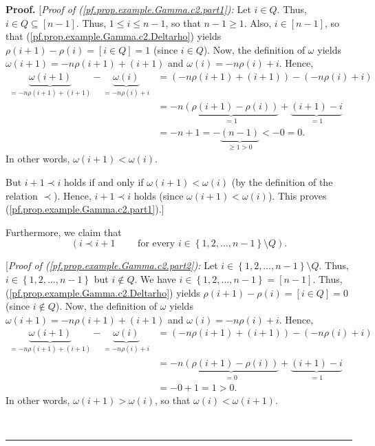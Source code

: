 \documentclass[numbers=enddot,12pt,final,onecolumn,notitlepage,abstracton]{scrartcl}
\theoremstyle{definition}
\newenvironment{proof}[1][Proof]{\noindent\textbf{#1.} }{\ \rule{0.5em}{0.5em}}
\newenvironment{verlong}{}{}
\begin{document}
\begin{verlong}
\begin{footnotesize}
\begin{proof}
[\textit{Proof of (\ref{pf.prop.example.Gamma.c2.part1}):} Let $i\in Q$. Thus,
$i\in Q\subseteq\left[  n-1\right]  $. Thus, $1\leq i\leq n-1$, so that
$n-1\geq1$. Also, $i\in\left[  n-1\right]  $, so that
(\ref{pf.prop.example.Gamma.c2.Deltarho}) yields $\rho\left(  i+1\right)
-\rho\left(  i\right)  =\left[  i\in Q\right]  =1$ (since $i\in Q$). Now, the
definition of $\omega$ yields $\omega\left(  i+1\right)  =-n\rho\left(
i+1\right)  +\left(  i+1\right)  $ and $\omega\left(  i\right)  =-n\rho\left(
i\right)  +i$. Hence,%
\begin{align*}
\underbrace{\omega\left(  i+1\right)  }_{=-n\rho\left(  i+1\right)  +\left(
i+1\right)  }-\underbrace{\omega\left(  i\right)  }_{=-n\rho\left(  i\right)
+i}  &  =\left(  -n\rho\left(  i+1\right)  +\left(  i+1\right)  \right)
-\left(  -n\rho\left(  i\right)  +i\right) \\
&  =-n\underbrace{\left(  \rho\left(  i+1\right)  -\rho\left(  i\right)
\right)  }_{=1}+\underbrace{\left(  i+1\right)  -i}_{=1}\\
&  =-n+1=-\underbrace{\left(  n-1\right)  }_{\geq1>0}<-0=0.
\end{align*}
In other words, $\omega\left(  i+1\right)  <\omega\left(  i\right)  $.

But $i+1\prec i$ holds if and only if $\omega\left(  i+1\right)
<\omega\left(  i\right)  $ (by the definition of the relation $\prec$). Hence,
$i+1\prec i$ holds (since $\omega\left(  i+1\right)  <\omega\left(  i\right)
$). This proves (\ref{pf.prop.example.Gamma.c2.part1}).]

Furthermore, we claim that%
\begin{equation}
\left(  i\prec i+1\qquad\text{ for every }i\in\left\{  1,2,\ldots,n-1\right\}
\setminus Q\right)  . \label{pf.prop.example.Gamma.c2.part2}%
\end{equation}


[\textit{Proof of (\ref{pf.prop.example.Gamma.c2.part2}):} Let $i\in\left\{
1,2,\ldots,n-1\right\}  \setminus Q$. Thus, $i\in\left\{  1,2,\ldots
,n-1\right\}  $ but $i\notin Q$. We have $i\in\left\{  1,2,\ldots,n-1\right\}
=\left[  n-1\right]  $. Thus, (\ref{pf.prop.example.Gamma.c2.Deltarho}) yields
$\rho\left(  i+1\right)  -\rho\left(  i\right)  =\left[  i\in Q\right]  =0$
(since $i\notin Q$). Now, the definition of $\omega$ yields $\omega\left(
i+1\right)  =-n\rho\left(  i+1\right)  +\left(  i+1\right)  $ and
$\omega\left(  i\right)  =-n\rho\left(  i\right)  +i$. Hence,%
\begin{align*}
\underbrace{\omega\left(  i+1\right)  }_{=-n\rho\left(  i+1\right)  +\left(
i+1\right)  }-\underbrace{\omega\left(  i\right)  }_{=-n\rho\left(  i\right)
+i}  &  =\left(  -n\rho\left(  i+1\right)  +\left(  i+1\right)  \right)
-\left(  -n\rho\left(  i\right)  +i\right) \\
&  =-n\underbrace{\left(  \rho\left(  i+1\right)  -\rho\left(  i\right)
\right)  }_{=0}+\underbrace{\left(  i+1\right)  -i}_{=1}\\
&  =-0+1=1>0.
\end{align*}
In other words, $\omega\left(  i+1\right)  >\omega\left(  i\right)  $, so that
$\omega\left(  i\right)  <\omega\left(  i+1\right)  $.


\end{proof}
\end{footnotesize}
\end{verlong}
\end{document}
